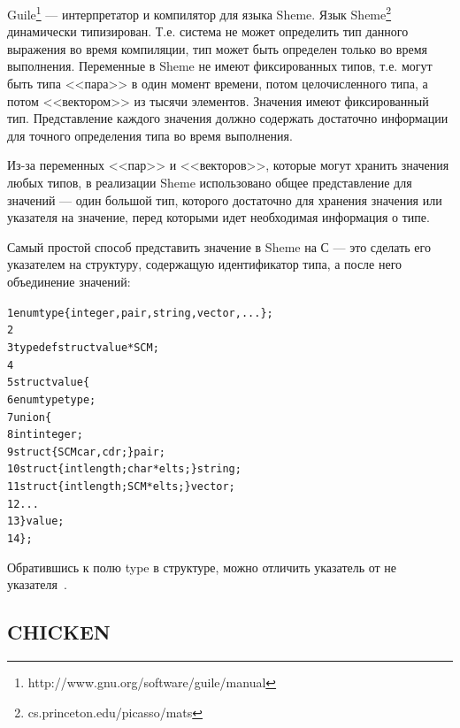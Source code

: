 \documentclass[12pt,a4paper]{article}
\begin{document}
Guile\footnote{http://www.gnu.org/software/guile/manual} — интерпретатор и компилятор для языка Sheme.
Язык Sheme\footnote{cs.princeton.edu/picasso/mats} динамически типизирован.
Т.е. система не может определить тип данного выражения во время компиляции, тип может быть определен только во время выполнения.
Переменные в Sheme не имеют фиксированных типов, т.е. могут быть
типа <<пара>> в один момент времени, потом целочисленного типа, а потом <<вектором>> из тысячи элементов. Значения
имеют фиксированный тип. Представление каждого значения должно содержать достаточно
информации для точного определения типа во время выполнения.

Из-за переменных <<пар>> и <<векторов>>, которые могут хранить значения любых типов,
в реализации Sheme использовано общее представление для значений — 
один большой тип, которого достаточно для хранения значения или указателя на значение,
перед которыми идет необходимая информация о типе.

Самый простой способ представить значение в Sheme на С — это сделать его указателем на структуру, содержащую идентификатор типа, а после него объединение 
 значений:
\begin{alltt}
1  enum type \{ integer, pair, string, vector, ... \};
2  
3  typedef struct value *SCM;
4  
5  struct value \{
6    enum type type;
7    union \{
8      int integer;
9      struct \{ SCM car, cdr; \} pair;
10     struct \{ int length; char *elts; \} string;
11     struct \{ int length; SCM  *elts; \} vector;
12     ...
13   \} value;
14 \};
\end{alltt}

Обратившись к полю type в структуре, можно отличить указатель от не указателя~\cite{guile}.

\subsection {CHICKEN}
\end{document}
